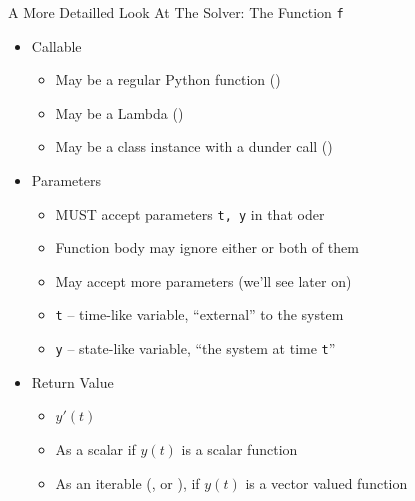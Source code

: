 \begin{frame}[fragile]{A More Detailled Look At The Solver: The Function \texttt{f}}
%
\begin{itemize}
\item Callable
	\begin{itemize}
	\item May be a regular Python function ()
	\item May be a Lambda ()
	\item May be a class instance with a dunder call ()
	\end{itemize}
\item Parameters
	\begin{itemize}
	\item MUST accept parameters \texttt{t, y} in that oder
	\item Function body may ignore either or both of them
	\item May accept more parameters (we'll see later on)
	\item \texttt{t} -- time-like variable, \enquote{external} to the system
	\item \texttt{y} -- state-like variable, \enquote{the system at time \texttt{t}}
	\end{itemize}
\item Return Value
	\begin{itemize}
	\item $y'(t)$
	\item As a scalar if $y(t)$ is a scalar function
	\item As an iterable (\zB {},  or ), if $y(t)$ is a vector valued function
	\end{itemize}
\end{itemize}
%
\end{frame}


